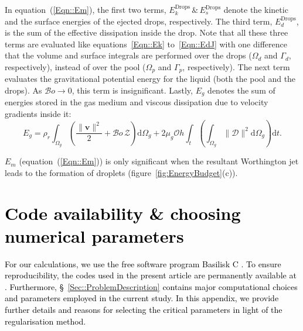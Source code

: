\documentclass[final]{jfm}
\newcommand*\red{\textcolor{black}}
\begin{document}
 In equation~(\ref{Eqn::Em}), the first two terms, $E_k^\text{Drops}\,\&\,E_s^\text{Drops}$ denote the kinetic and the surface energies of the ejected drops, respectively. The third term, $E_d^\text{Drops}$, is the sum of the effective dissipation inside the drop. Note that all these three terms are evaluated like equations~\ref{Eqn::Ek} to~\ref{Eqn::EdJ} with one difference that the volume and surface integrals are performed over the drops ($\Omega_d$ and $\Gamma_d$, respectively), instead of over the pool ($\Omega_p$ and $\Gamma_p$, respectively). The next term evaluates the gravitational potential energy for the liquid (both the pool and the drops). As $\mathcal{B}o \to 0$, this term is insignificant. Lastly, $E_g$ denotes the sum of energies stored in the gas medium and viscous dissipation due to velocity gradients inside it:
\begin{equation}\label{Eqn::Eg}
	E_g = \rho_r\int_{\Omega_g}\left(\frac{\|\boldsymbol{v}\|^2}{2} + \mathcal{B}o\,\mathcal{Z}\right)\mathrm{d}\Omega_g + 2\mu_g\mathcal{O}h\int_t\left(\int_{\Omega_g}\|\boldsymbol{\mathcal{D}}\|^2\mathrm{d}\Omega_g\right)\mathrm{d}t.
\end{equation}

\noindent$E_m$ (equation~(\ref{Eqn::Em})) is only significant when the resultant Worthington jet leads to the formation of droplets (figure~\ref{fig:EnergyBudget}(c)). 

\section{\red{Code availability \& choosing numerical parameters}}\label{App::codes}
\red{For our calculations, we use the free software program Basilisk C \citep{basiliskPopinet, popinet2015quadtree}. To ensure reproducibility, the codes used in the present article are permanently available at \citet{basiliskVatsal}. Furthermore, \S~\ref{Sec::ProblemDescription} contains major computational choices and parameters employed in the current study. In this appendix, we provide further details and reasons for selecting the critical parameters in light of the regularisation method.} 
\end{document}
